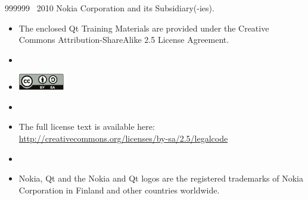   \begin{slide}{999999}
    \vspace{5em}
    \textcopyright~2010 Nokia Corporation and its Subsidiary(-ies).    
    \vspace{2em}                                                     
    \begin{itemize}
      \item[] \footnotesize{The enclosed Qt Training Materials are provided under the
        Creative Commons Attribution-ShareAlike 2.5 License Agreement.}
      \item[]
      \item[] \mbox{\includegraphics[width=20mm]{images/cc-by-sa}}
      \item[]
      \item[] \footnotesize{The full license text is available here:  
      \url{http://creativecommons.org/licenses/by-sa/2.5/legalcode}}
      \item[]    
      \item[] \footnotesize{Nokia, Qt and the Nokia and Qt logos are the registered trademarks 
      of Nokia Corporation in Finland and other countries worldwide.}
    \end{itemize}
    
  \end{slide}
